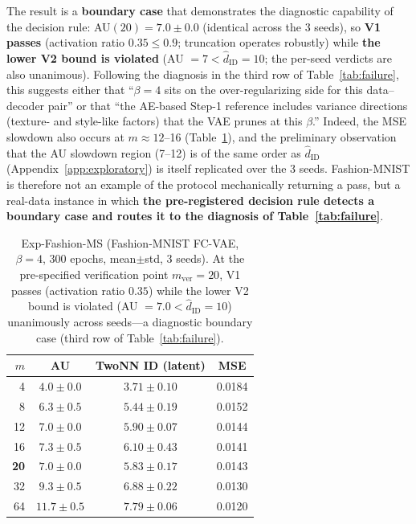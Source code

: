 \documentclass[make,article,submit,pdftex,moreauthors]{Definitions/mdpi}
\newcommand{\hatdID}{\hat{d}_{\mathrm{ID}}}
\begin{document}
The result is a \textbf{boundary case} that demonstrates the diagnostic
capability of the decision rule:
AU$(20) = 7.0 \pm 0.0$ (identical across the 3 seeds), so
\textbf{V1 passes} (activation ratio $0.35 \leq 0.9$; truncation operates
robustly) while \textbf{the lower V2 bound is violated}
(AU $= 7 < \hatdID = 10$; the per-seed verdicts are also unanimous).
Following the diagnosis in the third row of Table~\ref{tab:failure}, this
suggests either that ``$\beta = 4$ sits on the over-regularizing side for
this data--decoder pair'' or that ``the AE-based Step-1 reference includes
variance directions (texture- and style-like factors) that the VAE prunes
at this $\beta$.''
Indeed, the MSE slowdown also occurs at $m \approx 12$--16
(Table~\ref{tab:fashion_s3}), and the preliminary observation that the AU
slowdown region (7--12) is of the same order as $\hatdID$
(Appendix~\ref{app:exploratory}) is itself replicated over the 3 seeds.
Fashion-MNIST is therefore not an example of the protocol mechanically
returning a pass, but a real-data instance in which \textbf{the
pre-registered decision rule detects a boundary case and routes it to the
diagnosis of Table~\ref{tab:failure}}.

\begin{table}[H]
\caption{Exp-Fashion-MS (Fashion-MNIST FC-VAE, $\beta = 4$, 300 epochs,
mean$\pm$std, 3 seeds). At the pre-specified verification point
$m_{\mathrm{ver}} = 20$, V1 passes (activation ratio $0.35$) while the
lower V2 bound is violated (AU $= 7.0 < \hatdID = 10$) unanimously across
seeds---a diagnostic boundary case (third row of Table~\ref{tab:failure}).}
\label{tab:fashion_s3}
\small
\begin{tabular}{rccc}
\toprule
$m$ & \textbf{AU} & \textbf{TwoNN ID (latent)} & \textbf{MSE} \\
\midrule
 4 & $4.0 \pm 0.0$ & $3.71 \pm 0.10$ & 0.0184 \\
 8 & $6.3 \pm 0.5$ & $5.44 \pm 0.19$ & 0.0152 \\
12 & $7.0 \pm 0.0$ & $5.90 \pm 0.07$ & 0.0144 \\
16 & $7.3 \pm 0.5$ & $6.10 \pm 0.43$ & 0.0141 \\
\textbf{20} & $\boldsymbol{7.0 \pm 0.0}$ & $5.83 \pm 0.17$ & 0.0143 \\
32 & $9.3 \pm 0.5$ & $6.88 \pm 0.22$ & 0.0130 \\
64 & $11.7 \pm 0.5$ & $7.79 \pm 0.06$ & 0.0120 \\
\bottomrule
\end{tabular}
\end{table}
\end{document}
